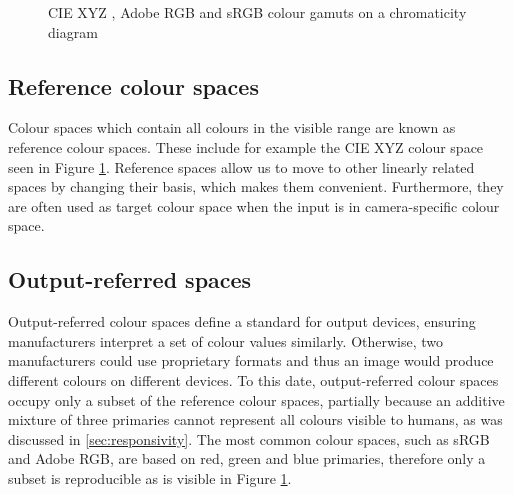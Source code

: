 \begin{figure}
    \centering
    \caption{CIE XYZ \cite{cie1931}, Adobe RGB \cite{adobeRGB} and sRGB \cite{sRGB} colour gamuts on a chromaticity diagram}
    \label{fig:gamut}
\end{figure}


\subsection{Reference colour spaces}

Colour spaces which contain all colours in the visible range are known as reference colour spaces. These include 
for example the CIE XYZ colour space seen in Figure \ref{fig:gamut}. Reference spaces allow us to move to other linearly related spaces by changing their basis, which makes them convenient. Furthermore, they are often used as target colour space when the input is in camera-specific colour space.


\subsection{Output-referred spaces}

Output-referred colour spaces define a standard for output devices, ensuring manufacturers interpret a set of colour values similarly. Otherwise, two manufacturers could use proprietary formats and thus an image would produce different colours on different devices. To this date, output-referred colour spaces occupy only a subset of the reference colour spaces, partially because an additive mixture of three primaries cannot represent all colours visible to humans, as was discussed in \ref{sec:responsivity}. The most common colour spaces, such as sRGB and Adobe RGB, are based on red, green and blue primaries, therefore only a subset is reproducible as is visible in Figure \ref{fig:gamut}.

